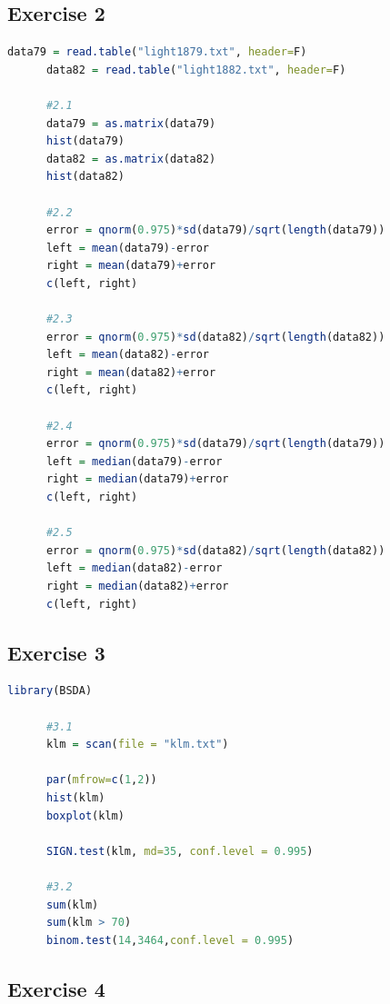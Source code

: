 \documentclass{article}
\begin{document}
    \subsection{Exercise 2}\label{sec:RE2}
      \begin{lstlisting}[language=R]
      data79 = read.table("light1879.txt", header=F)
      data82 = read.table("light1882.txt", header=F)

      #2.1
      data79 = as.matrix(data79)
      hist(data79)
      data82 = as.matrix(data82)
      hist(data82)

      #2.2
      error = qnorm(0.975)*sd(data79)/sqrt(length(data79))
      left = mean(data79)-error
      right = mean(data79)+error
      c(left, right)

      #2.3
      error = qnorm(0.975)*sd(data82)/sqrt(length(data82))
      left = mean(data82)-error
      right = mean(data82)+error
      c(left, right)

      #2.4
      error = qnorm(0.975)*sd(data79)/sqrt(length(data79))
      left = median(data79)-error
      right = median(data79)+error
      c(left, right)

      #2.5
      error = qnorm(0.975)*sd(data82)/sqrt(length(data82))
      left = median(data82)-error
      right = median(data82)+error
      c(left, right)
      \end{lstlisting}
    \subsection{Exercise 3}\label{sec:RE3}
      \begin{lstlisting}[language=R]
      library(BSDA)

      #3.1
      klm = scan(file = "klm.txt")

      par(mfrow=c(1,2))
      hist(klm)
      boxplot(klm)

      SIGN.test(klm, md=35, conf.level = 0.995)

      #3.2
      sum(klm)
      sum(klm > 70)
      binom.test(14,3464,conf.level = 0.995)

      \end{lstlisting}
    \subsection{Exercise 4}\label{sec:RE4}
      \begin{lstlisting}[language=R]
      
      \end{lstlisting}
\end{document}
